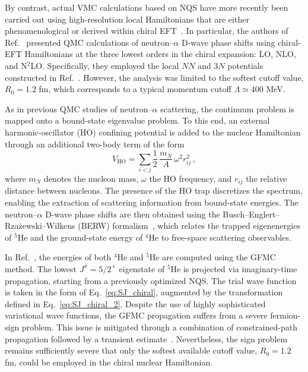 By contrast, actual VMC calculations based on NQS have more recently been carried out using high-resolution local Hamiltonians that are either phenomenological or derived within chiral EFT~\cite{yang_chiral_2025,wen_neural-network_2025,yang_zemach_2025}. In particular, the authors of Ref.~\cite{yang_chiral_2025} presented QMC calculations of neutron–$\alpha$ D-wave phase shifts using chiral-EFT Hamiltonians at the three lowest orders in the chiral expansion: LO, NLO, and N$^2$LO. Specifically, they employed the local $NN$ and $3N$ potentials constructed in Ref.~\cite{gezerlis_quantum_2013,lynn_quantum_2014}. However, the analysis was limited to the softest cutoff value, $R_0 = 1.2$ fm, which corresponds to a typical momentum cutoff $\Lambda \simeq 400$ MeV.

As in previous QMC studies of neutron--$\alpha$ scattering, the continuum problem is mapped onto a bound-state eigenvalue problem. To this end, an external harmonic-oscillator (HO) confining potential is added to the nuclear Hamiltonian through an additional two-body term of the form
\begin{equation}
V_{\text{HO}} = \sum_{i<j} \frac{1}{2}\,\frac{m_N}{A}\,\omega^2 r_{ij}^2 \, ,
\end{equation}
where $m_N$ denotes the nucleon mass, $\omega$ the HO frequency, and $r_{ij}$ the relative distance between nucleons. The presence of the HO trap discretizes the spectrum, enabling the extraction of scattering information from bound-state energies. The neutron--$\alpha$ D-wave phase shifts are then obtained using the Busch--Englert--Rza\.{z}ewski--Wilkens (BERW) formalism~\cite{busch_two_1998,buttiker_pionnucleon_2000}, which relates the trapped eigenenergies of $^5$He and the ground-state energy of $^4$He to free-space scattering observables.

In Ref.~\cite{yang_chiral_2025}, the energies of both $^4$He and $^5$He are computed using the GFMC method. The lowest $J^\pi = 5/2^+$ eigenstate of $^5$He is projected via imaginary-time propagation, starting from a previously optimized NQS. The trial wave function is taken in the form of Eq.~\eqref{eq:SJ_chiral}, augmented by the transformation defined in Eq.~\eqref{eq:SJ_chiral_2}.
Despite the use of highly sophisticated variational wave functions, the GFMC propagation suffers from a severe fermion-sign problem. This issue is mitigated through a combination of constrained-path propagation followed by a transient estimate~\cite{wiringa_quantum_2000}. Nevertheless, the sign problem remains sufficiently severe that only the softest available cutoff value, $R_0 = 1.2$ fm, could be employed in the chiral nuclear Hamiltonian.

